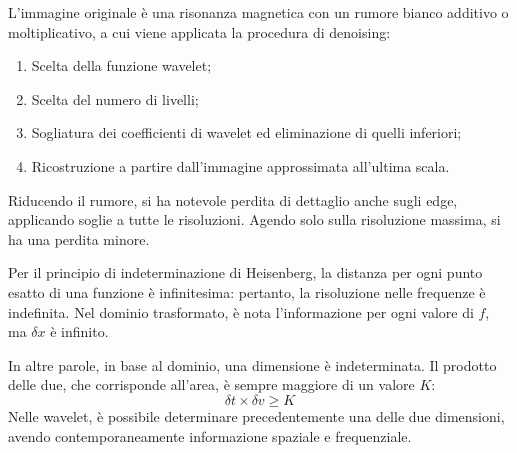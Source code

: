 L'immagine originale è una risonanza magnetica con un rumore bianco additivo o moltiplicativo, a cui viene applicata la procedura di denoising:
\begin{enumerate}
	\item Scelta della funzione wavelet;
	\item Scelta del numero di livelli;
	\item Sogliatura dei coefficienti di wavelet ed eliminazione di quelli inferiori;
	\item Ricostruzione a partire dall'immagine approssimata all'ultima scala.
\end{enumerate}

Riducendo il rumore, si ha notevole perdita di dettaglio anche sugli edge, applicando soglie a tutte le risoluzioni. Agendo solo sulla risoluzione massima, si ha una perdita minore.

Per il principio di indeterminazione di Heisenberg, la distanza per ogni punto esatto di una funzione è infinitesima: pertanto, la risoluzione nelle frequenze è indefinita. Nel dominio trasformato, è nota l'informazione per ogni valore di $f$, ma $\delta x$ è infinito. 

In altre parole, in base al dominio, una dimensione è indeterminata. Il prodotto delle due, che corrisponde all'area, è sempre maggiore di un valore $K$:
$$\delta t \times \delta v \geq K$$
Nelle wavelet, è possibile determinare precedentemente una delle due dimensioni, avendo contemporaneamente informazione spaziale e frequenziale.


